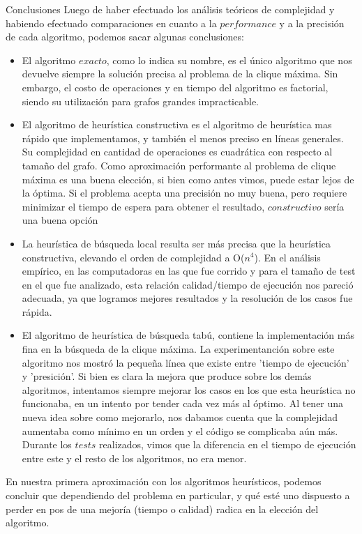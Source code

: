\documentclass[12pt,titlepage]{article}
\newcommand{\tab}{\hspace*{2em}}
\newcommand{\Ode}[1]{O($#1$)}
\begin{document}
	\begin{section}{Conclusiones}
	\tab Luego de haber efectuado los análisis teóricos de complejidad y habiendo efectuado comparaciones en cuanto a la $performance$ y a la precisión de cada algoritmo, podemos sacar algunas conclusiones:
	\begin{itemize}
		\item El algoritmo $exacto$, como lo indica su nombre, es el único algoritmo que nos devuelve siempre la solución precisa al problema de la clique máxima. Sin embargo, el costo de operaciones y en tiempo del algoritmo es factorial, siendo su utilización para grafos grandes impracticable.
		\item El algoritmo de heurística constructiva es el algoritmo de heurística mas rápido que implementamos, y también el menos preciso en líneas generales. Su complejidad en cantidad de operaciones es cuadrática con respecto al tamaño del grafo. Como aproximación performante al problema de clique máxima es una buena elección, si bien como antes vimos, puede estar lejos de la óptima. Si el problema acepta una precisión no muy buena, pero requiere minimizar el tiempo de espera para obtener el resultado, $constructivo$ sería una buena opción
		\item La heurística de búsqueda local resulta ser más precisa que la heurística constructiva, elevando el orden de complejidad a \Ode{n^4}. En el análisis empírico, en las computadoras en las que fue corrido y para el tamaño de test en el que fue analizado, esta relación calidad/tiempo de ejecución nos pareció adecuada, ya que logramos mejores resultados y la resolución de los casos fue rápida.
		\item El algoritmo de heurística de búsqueda tabú, contiene la implementación más fina en la búsqueda de la clique máxima. La experimentanción sobre este algoritmo nos mostró la pequeña línea que existe entre 'tiempo de ejecución' y 'presición'. Si bien es clara la mejora que produce sobre los demás algoritmos, intentamos siempre mejorar los casos en los que esta heurística no funcionaba, en un intento por tender cada vez más al óptimo. Al tener una nueva idea sobre como mejorarlo, nos dabamos cuenta que la complejidad aumentaba como mínimo en un orden y el código se complicaba aún más. Durante los $tests$ realizados, vimos que la diferencia en el tiempo de ejecución entre este y el resto de los algoritmos, no era menor. 
	\end{itemize}
	En nuestra primera aproximación con los algoritmos heurísticos, podemos concluir que dependiendo del problema en particular, y qué esté uno dispuesto a perder en pos de una mejoría (tiempo o calidad) radica en la elección del algoritmo.


\end{section}
\end{document}

